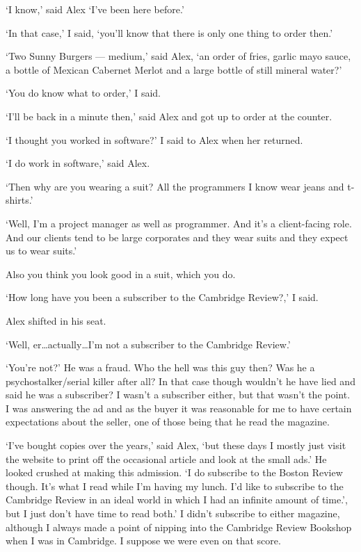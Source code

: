 `I know,' said Alex `I've been here before.'

`In that case,' I said, `you'll know that there is only one thing to
order then.'

`Two Sunny Burgers --- medium,' said Alex, `an order of fries,
garlic mayo sauce, a bottle of Mexican Cabernet Merlot and a large
bottle of still mineral water?'

`You do know what to order,' I said.

`I'll be back in a minute then,' said Alex and got up to order at
the counter.

`I thought you worked in software?' I said to Alex when her
returned.

`I do work in software,' said Alex.

`Then why are you wearing a suit? All the programmers I know wear
jeans and t-shirts.'

`Well, I'm a project manager as well as programmer. And it's a
client-facing role. And our clients tend to be large corporates and
they wear suits and they expect us to wear suits.'

Also you think you look good in a suit, which you do.

`How long have you been a subscriber to the {\twelvesl Cambridge
Review\/}?,' I said.

Alex shifted in his seat.

`Well, er\dots actually\dots I'm not a subscriber to the {\twelvesl
Cambridge Review\/}.'

`You're not?' He was a fraud. Who the hell was this guy then? Was he
a psychostalker/serial killer after all? In that case though
wouldn't he have lied and said he was a subscriber? I wasn't a
subscriber either, but that wasn't the point. I was {\twelveit
answering\/} the ad and as the buyer it was reasonable for me to
have certain expectations about the seller, one of those being that
he read the magazine.

`I've bought copies over the years,' said Alex, `but these days I
mostly just visit the website to print off the occasional article
and look at the small ads.' He looked crushed at making this
admission. `I do subscribe to the {\twelvesl Boston Review\/}
though. It's what I read while I'm having my lunch. I'd like to
subscribe to the {\twelvesl Cambridge Review\/} in an ideal world in
which I had an infinite amount of time.', but I just don't have time
to read both.' I didn't subscribe to either magazine, although I
always made a point of nipping into the Cambridge Review Bookshop
when I was in Cambridge. I suppose we were even on that score.

